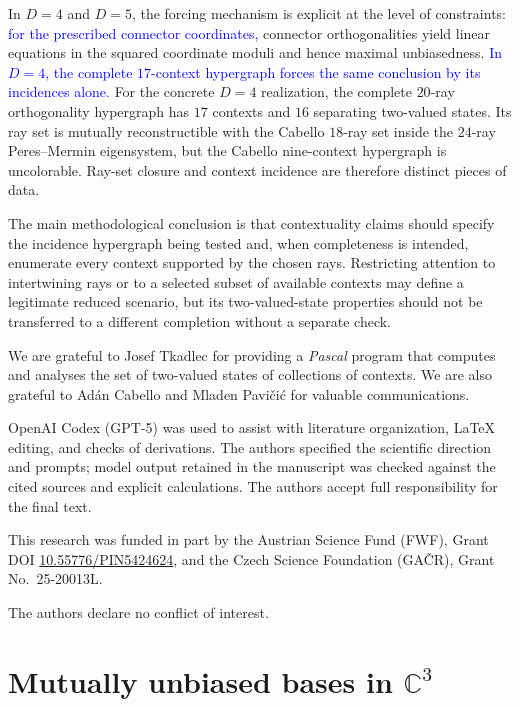 \documentclass[%
  reprint,
  superscriptaddress,
  showkeys,
  amsmath,amssymb,
  aps,pra,
  longbibliography,
  floatfix,
  x11names
]{revtex4-2}
\DeclareRobustCommand{\chg}[1]{\textcolor{blue}{#1}}
\begin{document}
In $D=4$ and $D=5$, the forcing mechanism is explicit at the level of constraints: \chg{for the prescribed connector coordinates,} connector orthogonalities yield linear equations in the squared coordinate moduli and hence maximal unbiasedness.  \chg{In $D=4$, the complete $17$-context hypergraph forces the same conclusion by its incidences alone.}  For the concrete $D=4$ realization, the complete $20$-ray orthogonality hypergraph has $17$ contexts and $16$ separating two-valued states.  Its ray set is mutually reconstructible with the Cabello $18$-ray set inside the $24$-ray Peres--Mermin eigensystem, but the Cabello nine-context hypergraph is uncolorable.  Ray-set closure and context incidence are therefore distinct pieces of data.

The main methodological conclusion is that contextuality claims should specify the incidence hypergraph being tested and, when completeness is intended, enumerate every context supported by the chosen rays.  Restricting attention to intertwining rays or to a selected subset of available contexts may define a legitimate reduced scenario, but its two-valued-state properties should not be transferred to a different completion without a separate check.

\begin{acknowledgments}
We are grateful to Josef Tkadlec for providing a {\em Pascal} program that computes and analyses the set of two-valued states of collections of contexts.
We are also grateful to Ad\'{a}n Cabello and Mladen Pavi{\v{c}}i{\'{c}} for valuable communications.

OpenAI Codex (GPT-5) was used to assist with literature organization, \LaTeX{}
editing, and checks of derivations.  The authors
specified the scientific
direction and prompts; model output retained in the manuscript was checked
against the cited sources and explicit calculations.  The authors accept
full
responsibility for the final text.

This research was funded in part by the Austrian
Science Fund (FWF), Grant DOI \href{https://doi.org/10.55776/PIN5424624}{10.55776/PIN5424624},
and the Czech Science
Foundation (GA\v{C}R), Grant No.~25-20013L.

The authors declare no conflict of interest.
\end{acknowledgments}



\appendix

\section{Mutually unbiased bases in \texorpdfstring{$\mathbb{C}^3$}{C\textasciicircum 3}}
\label{appendix:MUBsD3}
\end{document}
